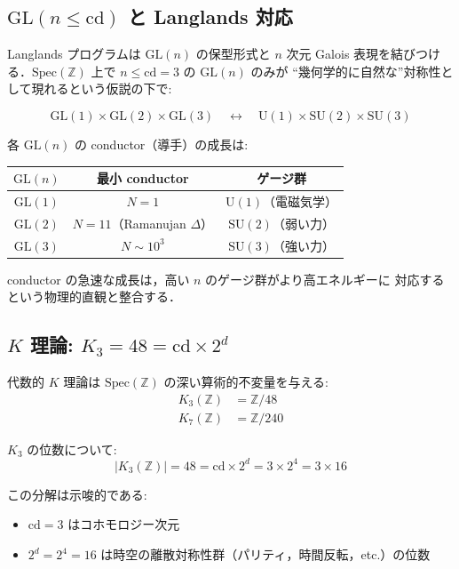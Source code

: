 \documentclass[11pt,a4paper]{article}
\begin{document}
\subsection{$\mathrm{GL}(n \leq \mathrm{cd})$ と Langlands 対応}

Langlands プログラムは $\mathrm{GL}(n)$ の保型形式と $n$ 次元
Galois 表現を結びつける．$\mathrm{Spec}(\mathbb{Z})$ 上で
$n \leq \mathrm{cd} = 3$ の $\mathrm{GL}(n)$ のみが
``幾何学的に自然な''対称性として現れるという仮説の下で:

\begin{equation}
\mathrm{GL}(1) \times \mathrm{GL}(2) \times \mathrm{GL}(3)
\quad\longleftrightarrow\quad
\mathrm{U}(1) \times \mathrm{SU}(2) \times \mathrm{SU}(3)
\end{equation}

各 $\mathrm{GL}(n)$ の conductor（導手）の成長は:
\begin{center}
\begin{tabular}{ccc}
\toprule
$\mathrm{GL}(n)$ & 最小 conductor & ゲージ群 \\
\midrule
$\mathrm{GL}(1)$ & $N = 1$ & $\mathrm{U}(1)$（電磁気学）\\
$\mathrm{GL}(2)$ & $N = 11$（Ramanujan $\Delta$）& $\mathrm{SU}(2)$（弱い力）\\
$\mathrm{GL}(3)$ & $N \sim 10^3$ & $\mathrm{SU}(3)$（強い力）\\
\bottomrule
\end{tabular}
\end{center}

conductor の急速な成長は，高い $n$ のゲージ群がより高エネルギーに
対応するという物理的直観と整合する．

\subsection{$K$ 理論: $K_3 = 48 = \mathrm{cd} \times 2^d$}

代数的 $K$ 理論は $\mathrm{Spec}(\mathbb{Z})$ の深い算術的不変量を与える:
\begin{align}
K_3(\mathbb{Z}) &= \mathbb{Z}/48 \\
K_7(\mathbb{Z}) &= \mathbb{Z}/240
\end{align}

$K_3$ の位数について:
\begin{equation}
|K_3(\mathbb{Z})| = 48 = \mathrm{cd} \times 2^d = 3 \times 2^4 = 3 \times 16
\end{equation}

この分解は示唆的である:
\begin{itemize}
\item $\mathrm{cd} = 3$ はコホモロジー次元
\item $2^d = 2^4 = 16$ は時空の離散対称性群（パリティ，時間反転，etc.）の位数
\end{itemize}
\end{document}
